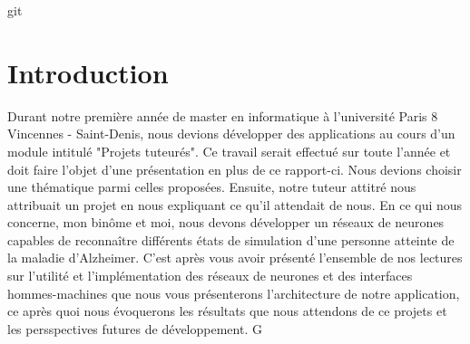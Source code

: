 git\part*{Introduction}

 Durant notre première année de master en informatique à l'université Paris 8 Vincennes - Saint-Denis, nous devions développer des applications au cours d'un module intitulé "Projets tuteurés".
 Ce travail serait effectué sur toute l'année et doit faire l'objet d'une présentation en plus de ce rapport-ci. Nous devions choisir une thématique parmi celles proposées.
 Ensuite, notre tuteur attitré nous attribuait un projet en nous expliquant ce qu'il attendait de nous. En ce qui nous concerne, mon binôme et moi, nous devons développer un réseaux de neurones capables de reconnaître différents états de simulation d'une personne atteinte de la maladie d'Alzheimer.
 C'est après vous avoir présenté l'ensemble de nos lectures sur l'utilité et l'implémentation des réseaux de neurones et des interfaces hommes-machines que nous vous présenterons l'architecture de notre application, ce après quoi nous évoquerons les résultats que nous attendons de ce projets et les persspectives futures de développement.
 G
